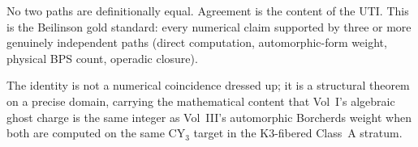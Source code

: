 \documentclass[11pt]{article}
\theoremstyle{definition}
\begin{document}
No two paths are definitionally equal. Agreement is the content of the
UTI. This is the Beilinson gold standard: every numerical claim supported
by three or more genuinely independent paths (direct computation,
automorphic-form weight, physical BPS count, operadic closure).

The identity is not a numerical coincidence dressed up; it is a
structural theorem on a precise domain, carrying the mathematical content
that Vol~I's algebraic ghost charge is the same integer as Vol~III's
automorphic Borcherds weight when both are computed on the same CY$_3$
target in the K3-fibered Class~A stratum.
\end{document}
